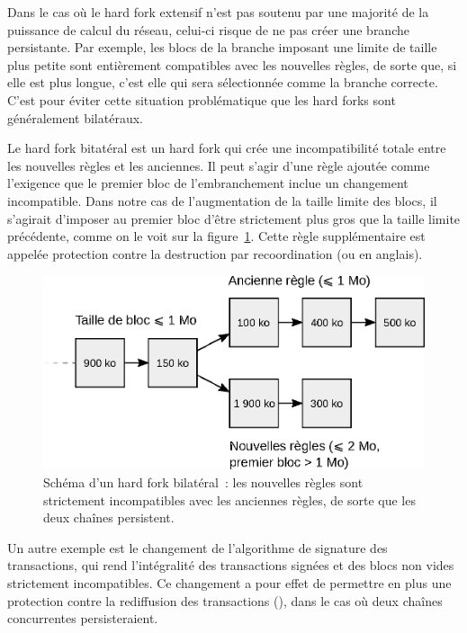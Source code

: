 Dans le cas où le hard fork extensif n'est pas soutenu par une majorité de la puissance de calcul du réseau, celui-ci risque de ne pas créer une branche persistante. Par exemple, les blocs de la branche imposant une limite de taille plus petite sont entièrement compatibles avec les nouvelles règles, de sorte que, si elle est plus longue, c'est elle qui sera sélectionnée comme la branche correcte. C'est pour éviter cette situation problématique que les hard forks sont généralement bilatéraux.

Le hard fork bitatéral est un hard fork qui crée une incompatibilité totale entre les nouvelles règles et les anciennes. Il peut s'agir d'une règle ajoutée comme l'exigence que le premier bloc de l'embranchement inclue un changement incompatible. Dans notre cas de l'augmentation de la taille limite des blocs, il s'agirait d'imposer au premier bloc d'être strictement plus gros que la taille limite précédente, comme on le voit sur la figure~\ref{fig:expanding-hard-fork-failure}. Cette règle supplémentaire est appelée protection contre la destruction par recoordination (ou  en anglais).

\begin{figure}[h]
  \centering
  \includegraphics[scale=0.65]{img/bilateral-hard-fork-induced-fork.eps}
  \caption{Schéma d'un hard fork bilatéral~: les nouvelles règles sont strictement incompatibles avec les anciennes règles, de sorte que les deux chaînes persistent.}
  \label{fig:expanding-hard-fork-failure}
\end{figure}

Un autre exemple est le changement de l'algorithme de signature des transactions, qui rend l'intégralité des transactions signées et des blocs non vides strictement incompatibles. Ce changement a pour effet de permettre en plus une protection contre la rediffusion des transactions (), dans le cas où deux chaînes concurrentes persisteraient.

